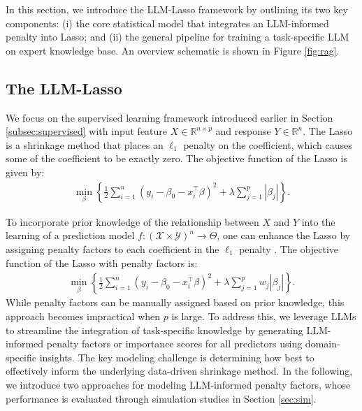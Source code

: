 In this section, we introduce the LLM-Lasso framework by outlining its two key components: (i) the core statistical model that integrates an LLM-informed penalty into Lasso; and (ii) the general pipeline for training a task-specific LLM on expert knowledge base. An overview schematic is shown in  Figure \ref{fig:rag}.

\subsection{The LLM-Lasso}\label{subsec:llm_lasso}
We focus on the supervised learning framework introduced earlier in Section \ref{subsec:supervised} with input feature $X \in \mathbb{R}^{n \times p}$ and response $Y \in \mathbb{R}^n$. %
The Lasso is a shrinkage method that places an $\ell_1$ penalty on the coefficient, which causes some of the coefficient to be exactly zero. The objective function of the Lasso is given by:
\begin{align}
    \underset{\beta}{\min} \left\{\frac{1}{2} \sum_{i=1}^n (y_i - \beta_0 - x_i^\top \beta)^2 + \lambda \sum_{j=1}^p |\beta_j| \right\}.
\end{align}

To incorporate prior knowledge of the relationship between \( X \) and \( Y \) into the learning of a prediction model \( f: (\mathcal{X} \times \mathcal{Y})^n \rightarrow \Theta \), one can enhance the Lasso by assigning penalty factors to each coefficient in the \( \ell_1 \) penalty \citep{zou2006adaptive}. The objective function of the Lasso with penalty factors is: 
\begin{align}
    \underset{\beta}{\min} \left\{\frac{1}{2} \sum_{i=1}^n (y_i - \beta_0 -x_i^\top \beta)^2 + \lambda \sum_{j=1}^p w_j |\beta_j| \right\}.
\end{align}
While penalty factors can be manually assigned based on prior knowledge, this approach becomes impractical when \( p \) is large. To address this, we leverage LLMs to streamline the integration of task-specific knowledge by generating LLM-informed penalty factors or importance scores for all predictors using domain-specific insights. The key modeling challenge is determining how best to effectively inform the underlying data-driven shrinkage method. In the following, we introduce two approaches for modeling LLM-informed penalty factors, whose performance is evaluated through simulation studies in Section \ref{sec:sim}.


